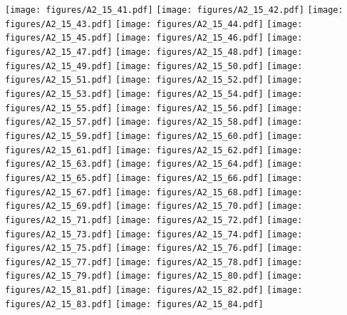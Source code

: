 \documentclass[12pt,a4paper]{article}
\begin{document}
\texttt{[image: figures/A2\_15\_41.pdf]}
\texttt{[image: figures/A2\_15\_42.pdf]}
\texttt{[image: figures/A2\_15\_43.pdf]}
\texttt{[image: figures/A2\_15\_44.pdf]}
\texttt{[image: figures/A2\_15\_45.pdf]}
\texttt{[image: figures/A2\_15\_46.pdf]}
\texttt{[image: figures/A2\_15\_47.pdf]}
\texttt{[image: figures/A2\_15\_48.pdf]}
\texttt{[image: figures/A2\_15\_49.pdf]}
\texttt{[image: figures/A2\_15\_50.pdf]}
\texttt{[image: figures/A2\_15\_51.pdf]}
\texttt{[image: figures/A2\_15\_52.pdf]}
\texttt{[image: figures/A2\_15\_53.pdf]}
\texttt{[image: figures/A2\_15\_54.pdf]}
\texttt{[image: figures/A2\_15\_55.pdf]}
\texttt{[image: figures/A2\_15\_56.pdf]}
\texttt{[image: figures/A2\_15\_57.pdf]}
\texttt{[image: figures/A2\_15\_58.pdf]}
\texttt{[image: figures/A2\_15\_59.pdf]}
\texttt{[image: figures/A2\_15\_60.pdf]}
\texttt{[image: figures/A2\_15\_61.pdf]}
\texttt{[image: figures/A2\_15\_62.pdf]}
\texttt{[image: figures/A2\_15\_63.pdf]}
\texttt{[image: figures/A2\_15\_64.pdf]}
\texttt{[image: figures/A2\_15\_65.pdf]}
\texttt{[image: figures/A2\_15\_66.pdf]}
\texttt{[image: figures/A2\_15\_67.pdf]}
\texttt{[image: figures/A2\_15\_68.pdf]}
\texttt{[image: figures/A2\_15\_69.pdf]}
\texttt{[image: figures/A2\_15\_70.pdf]}
\texttt{[image: figures/A2\_15\_71.pdf]}
\texttt{[image: figures/A2\_15\_72.pdf]}
\texttt{[image: figures/A2\_15\_73.pdf]}
\texttt{[image: figures/A2\_15\_74.pdf]}
\texttt{[image: figures/A2\_15\_75.pdf]}
\texttt{[image: figures/A2\_15\_76.pdf]}
\texttt{[image: figures/A2\_15\_77.pdf]}
\texttt{[image: figures/A2\_15\_78.pdf]}
\texttt{[image: figures/A2\_15\_79.pdf]}
\texttt{[image: figures/A2\_15\_80.pdf]}
\texttt{[image: figures/A2\_15\_81.pdf]}
\texttt{[image: figures/A2\_15\_82.pdf]}
\texttt{[image: figures/A2\_15\_83.pdf]}
\texttt{[image: figures/A2\_15\_84.pdf]}
\end{document}
